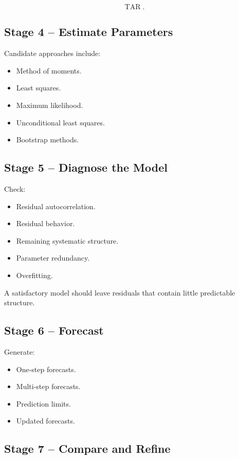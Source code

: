 \documentclass[11pt,a4paper]{article}
\newcommand{\TAR}{\operatorname{TAR}}
\begin{document}
\[
\TAR.
\]

\subsection{Stage 4 -- Estimate Parameters}

Candidate approaches include:

\begin{itemize}
    \item Method of moments.
    \item Least squares.
    \item Maximum likelihood.
    \item Unconditional least squares.
    \item Bootstrap methods.
\end{itemize}

\subsection{Stage 5 -- Diagnose the Model}

Check:

\begin{itemize}
    \item Residual autocorrelation.
    \item Residual behavior.
    \item Remaining systematic structure.
    \item Parameter redundancy.
    \item Overfitting.
\end{itemize}

A satisfactory model should leave residuals that contain little predictable
structure.

\subsection{Stage 6 -- Forecast}

Generate:

\begin{itemize}
    \item One-step forecasts.
    \item Multi-step forecasts.
    \item Prediction limits.
    \item Updated forecasts.
\end{itemize}

\subsection{Stage 7 -- Compare and Refine}
\end{document}
